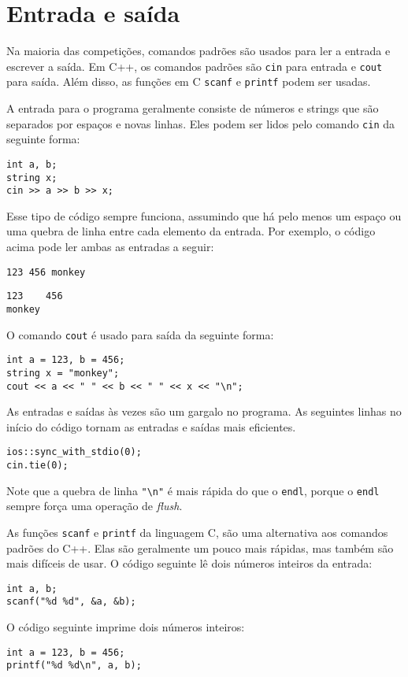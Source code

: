 \section{Entrada e saída}


Na maioria das competições, comandos padrões são usados para ler a entrada e escrever a saída. Em C++, os comandos padrões são \texttt{cin} para entrada e \texttt{cout} para saída. Além disso, as funções em C \texttt{scanf} e \texttt{printf} podem ser usadas.

A entrada para o programa geralmente consiste de números e strings que são separados por espaços e novas linhas. Eles podem ser lidos pelo comando \texttt{cin} da seguinte forma:

\begin{lstlisting}
int a, b;
string x;
cin >> a >> b >> x;
\end{lstlisting}

Esse tipo de código sempre funciona,
assumindo que há pelo menos um espaço
ou uma quebra de linha entre cada elemento da entrada.
Por exemplo, o código acima pode ler
ambas as entradas a seguir:
\begin{lstlisting}
123 456 monkey
\end{lstlisting}
\begin{lstlisting}
123    456
monkey
\end{lstlisting}
O comando \texttt{cout} é usado para saída
da seguinte forma:
\begin{lstlisting}
int a = 123, b = 456;
string x = "monkey";
cout << a << " " << b << " " << x << "\n";
\end{lstlisting}

As entradas e saídas às vezes são um gargalo no programa. As seguintes linhas no início do código tornam as entradas e saídas mais eficientes.

\begin{lstlisting}
ios::sync_with_stdio(0);
cin.tie(0);
\end{lstlisting}

Note que a quebra de linha \texttt{"\textbackslash n"} é mais rápida do que o \texttt{endl}, porque o \texttt{endl} sempre força uma operação de \emph{flush}.

As funções \texttt{scanf} e \texttt{printf} da linguagem C, são uma alternativa aos comandos padrões do C++. Elas são geralmente um pouco mais rápidas, mas também são mais difíceis de usar. O código seguinte lê dois números inteiros da entrada:
\begin{lstlisting}
int a, b;
scanf("%d %d", &a, &b);
\end{lstlisting}
O código seguinte imprime dois números inteiros:
\begin{lstlisting}
int a = 123, b = 456;
printf("%d %d\n", a, b);
\end{lstlisting}

